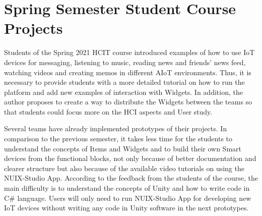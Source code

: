 \section{Spring Semester Student Course Projects}

Students of the Spring 2021 HCIT course introduced examples of how to use IoT devices for messaging, listening to music, reading news and friends' news feed, watching videos and creating memos in different AIoT environments. Thus, it is necessary to provide students with a more detailed tutorial on how to run the platform and add new examples of interaction with Widgets. In addition, the author proposes to create a way to distribute the  Widgets between the teams so that students could focus more on the HCI aspects and User study. 

Several teams have already implemented prototypes of their projects. In comparison to the previous semester, it takes less time for the students to understand the concepts of Items and Widgets and to build their own Smart devices from the functional blocks, not only because of better documentation and clearer structure but also because of the available video tutorials on using the NUIX-Studio App. According to the feedback from the students of the course, the main difficulty is to understand the concepts of Unity and how to write code in C\# language. Users will only need to run NUIX-Studio App for developing new IoT devices without writing any code in Unity software in the next prototypes.